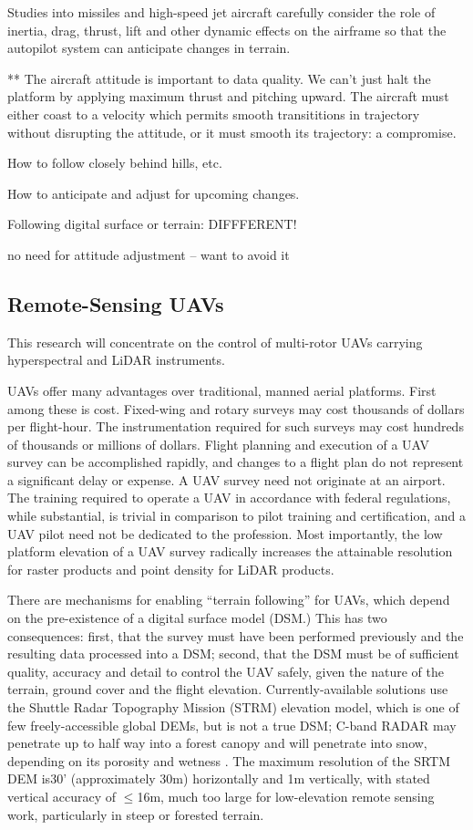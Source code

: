 \documentclass[10pt,a4paper]{report}
\begin{document}
Studies into missiles and high-speed jet aircraft carefully consider the role of inertia, drag, thrust, lift and other dynamic effects on the airframe so that the autopilot system can anticipate changes in terrain. 

** The aircraft attitude is important to data quality. We can't just halt the platform by applying maximum thrust and pitching upward. The aircraft must either coast to a velocity which permits smooth transititions in trajectory without disrupting the attitude, or it must smooth its trajectory: a compromise.



How to follow closely behind hills, etc. 

How to anticipate and adjust for upcoming changes.

Following digital surface or terrain: DIFFFERENT!

no need for attitude adjustment -- want to avoid it




\subsection{Remote-Sensing UAVs}

This research will concentrate on the control of multi-rotor UAVs carrying hyperspectral and LiDAR instruments.

UAVs offer many advantages over traditional, manned aerial platforms. First among these is cost. Fixed-wing and rotary surveys may cost thousands of dollars per flight-hour. The instrumentation required for such surveys may cost hundreds of thousands or millions  of dollars. Flight planning and execution of a UAV survey can be accomplished rapidly, and changes to a flight plan do not represent a significant delay or expense. A UAV survey need not originate at an airport. The training required to operate a UAV in accordance with federal regulations, while substantial, is trivial in comparison to pilot training and certification, and a UAV pilot need not be dedicated to the profession. Most importantly, the low platform elevation of a UAV survey radically increases the attainable resolution for raster products and point density for LiDAR products.

There are mechanisms for enabling “terrain following” for UAVs, which depend on the pre-existence of a digital surface model (DSM.) This has two consequences: first, that the survey must have been performed previously and the resulting data processed into a DSM; second, that the DSM must be of sufficient quality, accuracy and detail to control the UAV safely, given the nature of the terrain, ground cover and the flight elevation. Currently-available solutions use the Shuttle Radar Topography Mission (STRM) elevation model, which is one of few freely-accessible global DEMs, but is not a true DSM; C-band RADAR may penetrate up to half way into a forest canopy \cite{Carabajal2005} and will penetrate into snow, depending on its porosity and wetness \cite{Tighe2009}. The maximum resolution of the SRTM DEM is30' (approximately 30m) horizontally and 1m vertically, with stated vertical accuracy of $\leq$16m, much too large for low-elevation remote sensing work, particularly in steep or forested terrain.  
\end{document}
